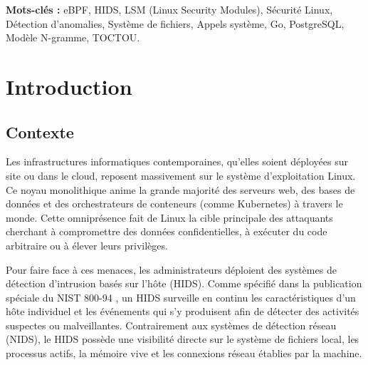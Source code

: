 \documentclass[11pt,a4paper]{article}
\begin{document}
\vspace{1cm}
\noindent \textbf{Mots-clés :} eBPF, HIDS, LSM (Linux Security Modules), Sécurité Linux, Détection d'anomalies, Système de fichiers, Appels système, Go, PostgreSQL, Modèle N-gramme, TOCTOU.

\newpage
\tableofcontents
\newpage

\section{Introduction}

\subsection{Contexte}
Les infrastructures informatiques contemporaines, qu'elles soient déployées sur site ou dans le cloud, reposent massivement sur le système d'exploitation Linux. Ce noyau monolithique anime la grande majorité des serveurs web, des bases de données et des orchestrateurs de conteneurs (comme Kubernetes) à travers le monde. Cette omniprésence fait de Linux la cible principale des attaquants cherchant à compromettre des données confidentielles, à exécuter du code arbitraire ou à élever leurs privilèges.

Pour faire face à ces menaces, les administrateurs déploient des systèmes de détection d'intrusion basés sur l'hôte (HIDS). Comme spécifié dans la publication spéciale du NIST 800-94 \cite{nist}, un HIDS surveille en continu les caractéristiques d'un hôte individuel et les événements qui s'y produisent afin de détecter des activités suspectes ou malveillantes. Contrairement aux systèmes de détection réseau (NIDS), le HIDS possède une visibilité directe sur le système de fichiers local, les processus actifs, la mémoire vive et les connexions réseau établies par la machine.
\end{document}
